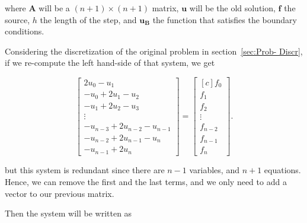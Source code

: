 \documentclass[fontsize=11pt,paper=a4,titlepage]{article}
\begin{document}
where $\mathbf{A}$ will be a $(n + 1) \times (n + 1)$ matrix, $\mathbf{u}$ will
be the old solution, $\mathbf{f}$ the source, $h$ the length of the step, and
$\mathbf{u_B}$ the function that satisfies the boundary conditions.

Considering the discretization of the original problem in section~\ref{sec:Prob-
Discr}, if we re-compute the left hand-side of that system, we get

\begin{displaymath}
\begin{bmatrix}
	2u_0 - u_1 \\
	- u_0 + 2u_1 - u_2 \\
	- u_1 + 2u_2 - u_3 \\
	\vdots \\
	- u_{n - 3} + 2u_{n - 2} - u_{n - 1} \\
	- u_{n - 2} + 2u_{n - 1} - u_{n} \\
	- u_{n - 1} + 2u_n
\end{bmatrix}
=
\begin{bmatrix*}[c]
	f_0 \\
	f_1 \\
	f_2 \\
	\vdots \\
	f_{n - 2} \\
	f_{n - 1} \\
	f_n
\end{bmatrix*}.
\end{displaymath}

but this system is redundant since there are $n - 1$ variables, and $n + 1$
equations. Hence, we can remove the first and the last terms, and we only need
to add a vector to our previous matrix.

Then the system will be written as
\end{document}
